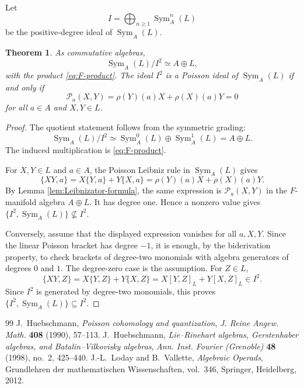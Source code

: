 \documentclass[10pt,a4paper]{amsart}
\newtheorem{theorem}{Theorem}[section]
\newcommand{\Sym}{\operatorname{Sym}}
\newcommand{\Pcal}{\mathcal P}
\begin{document}
	Let
	\[
	I=\bigoplus_{n\geq1}\Sym_A^n(L)
	\]
	be the positive-degree ideal of $\Sym_A(L)$.
	

	\begin{theorem}\label{thm:first-order-truncation}
		As commutative algebras,
		\[
		\Sym_A(L)/I^2\simeq A\oplus L,
		\]
		with the product \eqref{eq:F-product}.  The ideal $I^2$ is a Poisson ideal of
		$\Sym_A(L)$ if and only if
		\[
		\Pcal_a(X,Y)=\rho(Y)(a)X+\rho(X)(a)Y=0
		\]
		for all $a\in A$ and $X,Y\in L$.
	\end{theorem}

	\begin{proof}
		The quotient statement follows from the symmetric grading:
		\[
		\Sym_A(L)/I^2\simeq \Sym_A^0(L)\oplus \Sym_A^1(L)=A\oplus L.
		\]
		The induced multiplication is \eqref{eq:F-product}.
		
		For $X,Y\in L$ and $a\in A$, the Poisson Leibniz rule in $\Sym_A(L)$ gives
		\[
		\{XY,a\}=X\{Y,a\}+Y\{X,a\}
		=\rho(Y)(a)X+\rho(X)(a)Y.
		\]
		By Lemma \ref{lem:Leibnizator-formula}, the same expression is
		$\Pcal_a(X,Y)$ in the $F$-manifold algebra $A\oplus L$.  It has
		degree one.  Hence a nonzero value gives
		$\{I^2,\Sym_A(L)\}\not\subseteq I^2$.
		
		Conversely, assume that the displayed expression vanishes for all $a,X,Y$.
		Since the linear Poisson bracket has  degree $-1$, it is enough, by
		the biderivation property, to check brackets of degree-two monomials with
		algebra generators of degrees $0$ and $1$.  The degree-zero case is the
		assumption.  For $Z\in L$,
		\[
		\{XY,Z\}=X\{Y,Z\}+Y\{X,Z\}=X[Y,Z]_L+Y[X,Z]_L\in I^2.
		\]
		Since $I^2$ is generated by degree-two monomials, this proves
		$\{I^2,\Sym_A(L)\}\subseteq I^2$.
	\end{proof}
	

\begin{thebibliography}{99}
 J.~Huebschmann, \emph{Poisson cohomology and quantization}, \emph{J. Reine Angew. Math.} \textbf{408} (1990), 57--113.
 J.~Huebschmann, \emph{Lie--Rinehart algebras, Gerstenhaber algebras, and Batalin--Vilkovisky algebras}, \emph{Ann. Inst. Fourier (Grenoble)} \textbf{48} (1998), no.~2, 425--440.
 J.-L.~Loday and B.~Vallette, \emph{Algebraic Operads}, Grundlehren der mathematischen Wissenschaften, vol.~346, Springer, Heidelberg, 2012.
\end{thebibliography}
\end{document}
